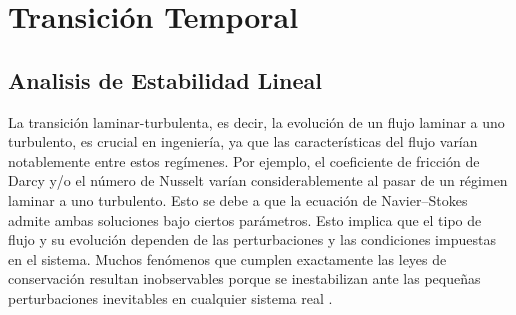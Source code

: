 \chapter{Transición Temporal}




\newpage

\section{Analisis de Estabilidad Lineal}





La transición laminar-turbulenta, es decir, la evolución de un flujo laminar a uno turbulento, es crucial en ingeniería, ya que las características del flujo varían notablemente entre estos regímenes. Por ejemplo, el coeficiente de fricción de Darcy y/o el número de Nusselt varían considerablemente al pasar de un régimen laminar a uno turbulento. Esto se debe a que la ecuación de Navier–Stokes admite ambas soluciones bajo ciertos parámetros. Esto implica que el tipo de flujo y su evolución dependen de las perturbaciones y las condiciones impuestas en el sistema. Muchos fenómenos que cumplen exactamente las leyes de conservación resultan inobservables porque se inestabilizan ante las pequeñas perturbaciones inevitables en cualquier sistema real \cite{kundu}.

